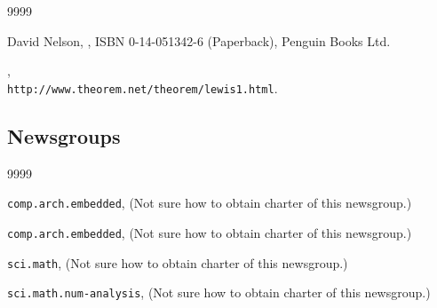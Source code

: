 \begin{thecustombibliography}{9999}

David Nelson,
,
ISBN 0-14-051342-6 (Paperback),
Penguin Books Ltd.

, \\
\texttt{http://www.theorem.net/theorem/lewis1.html}.

\end{thecustombibliography}


\subsection*{Newsgroups}

\begin{thecustombibliography}{9999}

\texttt{comp.arch.embedded}, (Not sure how to obtain charter of this newsgroup.)

\texttt{comp.arch.embedded}, (Not sure how to obtain charter of this newsgroup.)

\texttt{sci.math}, (Not sure how to obtain charter of this newsgroup.)

\texttt{sci.math.num-analysis}, (Not sure how to obtain charter of this newsgroup.)

\end{thecustombibliography}

%

